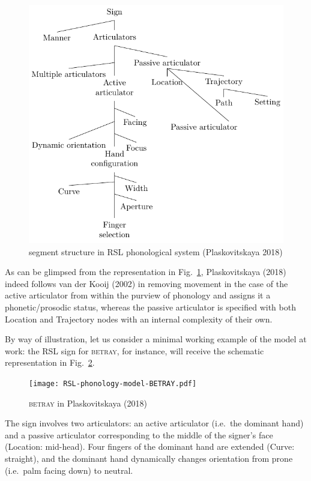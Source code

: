 \begin{figure}
\hypertarget{fig:plaskovitskaya}{%
\centering
\includegraphics{RSL-phonology-plaskovitskaya-2018-model.pdf}
\caption{segment structure in RSL phonological system (Plaskovitskaya
2018)}\label{fig:plaskovitskaya}
}
\end{figure}

As can be glimpsed from the representation in
Fig.~\ref{fig:plaskovitskaya}, Plaskovitskaya (2018) indeed follows van
der Kooij (2002) in removing movement in the case of the active
articulator from within the purview of phonology and assigns it a
phonetic/prosodic status, whereas the passive articulator is specified
with both Location and Trajectory nodes with an internal complexity of
their own.

By way of illustration, let us consider a minimal working example of the
model at work: the RSL sign for \textsc{betray}, for instance, will
receive the schematic representation in Fig.~\ref{fig:betray}.

\begin{figure}
\hypertarget{fig:betray}{%
\centering
\texttt{[image: RSL-phonology-model-BETRAY.pdf]}
\caption{\textsc{betray} in Plaskovitskaya (2018)}\label{fig:betray}
}
\end{figure}

The sign involves two articulators: an active articulator (i.e.~the
dominant hand) and a passive articulator corresponding to the middle of
the signer's face (Location: mid-head). Four fingers of the dominant
hand are extended (Curve: straight), and the dominant hand dynamically
changes orientation from prone (i.e.~palm facing down) to neutral.

